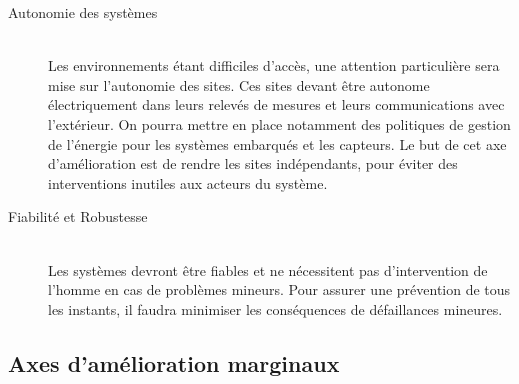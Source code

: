 \begin{description}
	\item[Autonomie des systèmes]\hfill\\

	Les environnements étant difficiles d'accès, une attention
	particulière sera mise sur l'autonomie des sites. Ces sites devant
	être autonome électriquement dans leurs relevés de mesures et leurs
	communications avec l'extérieur. On pourra mettre en place
	notamment des politiques de gestion de l'énergie pour les systèmes
	embarqués et les capteurs. Le but de cet axe d'amélioration est de
	rendre les sites indépendants, pour éviter des interventions
	inutiles aux acteurs du système.\\

	\item[Fiabilité et Robustesse]\hfill\\

	Les systèmes devront être fiables et ne nécessitent pas
	d'intervention de l'homme en cas de problèmes mineurs. Pour assurer
	une prévention de tous les instants, il faudra minimiser les
	conséquences de défaillances mineures.\\

\end{description}


\subsection{Axes d'amélioration marginaux}

